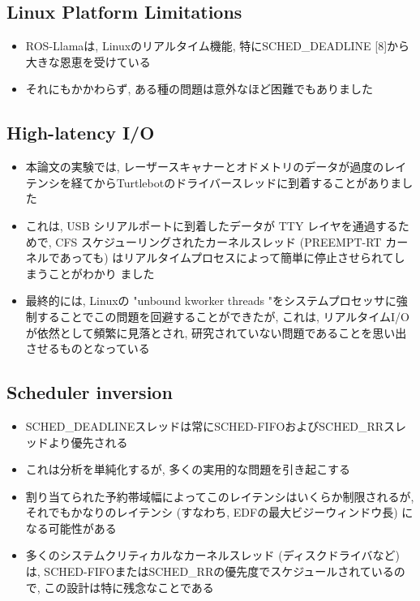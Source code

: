 \subsection{Linux Platform Limitations}
\label{ssec: linux platform limitations}

\begin{frame}{}
    \begin{itemize}
        \item ROS-Llamaは, Linuxのリアルタイム機能, 特にSCHED\_DEADLINE [8]から大きな恩恵を受けている
        \item それにもかかわらず, ある種の問題は意外なほど困難でもありました
    \end{itemize}
\end{frame}


\subsection{High-latency I/O}
\label{ssec: high-latency i/o}

\begin{frame}{}
    \begin{itemize}
        \item 本論文の実験では, レーザースキャナーとオドメトリのデータが過度のレイテンシを経てからTurtlebotのドライバースレッドに到着することがありました
        \item これは, USB シリアルポートに到着したデータが TTY レイヤを通過するためで, CFS スケジューリングされたカーネルスレッド (PREEMPT-RT カーネルであっても) はリアルタイムプロセスによって簡単に停止させられてしまうことがわかり ました
        \item 最終的には, Linuxの "unbound kworker threads "をシステムプロセッサに強制することでこの問題を回避することができたが, これは, リアルタイムI/Oが依然として頻繁に見落とされ, 研究されていない問題であることを思い出させるものとなっている
    \end{itemize}
\end{frame}


\subsection{Scheduler inversion}
\label{ssec: scheduler inversion}

\begin{frame}{}
    \begin{itemize}
        \item SCHED\_DEADLINEスレッドは常にSCHED-FIFOおよびSCHED\_RRスレッドより優先される
        \item これは分析を単純化するが, 多くの実用的な問題を引き起こする
        \item 割り当てられた予約帯域幅によってこのレイテンシはいくらか制限されるが, それでもかなりのレイテンシ (すなわち, EDFの最大ビジーウィンドウ長) になる可能性がある
        \item 多くのシステムクリティカルなカーネルスレッド (ディスクドライバなど) は, SCHED-FIFOまたはSCHED\_RRの優先度でスケジュールされているので, この設計は特に残念なことである
    \end{itemize}
\end{frame}

